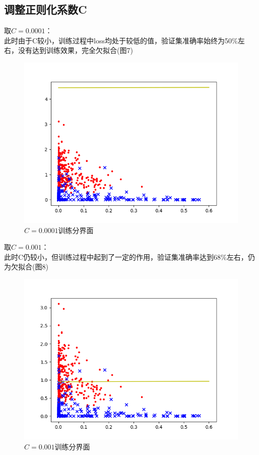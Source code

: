 \documentclass[a4paper]{article}
\begin{document}
\subsection{调整正则化系数C}
取$ C=0.0001 $：\\
此时由于C较小，训练过程中loss均处于较低的值，验证集准确率始终为50\%左右，没有达到训练效果，完全欠拟合(图7)\\
\begin{figure}
    \centering
    \includegraphics[width=12cm]{Fig_7.png}
    \caption{$ C = 0.0001 $训练分界面}
\end{figure}

取$ C = 0.001 $：\\
此时C仍较小，但训练过程中起到了一定的作用，验证集准确率达到68\%左右，仍为欠拟合(图8)\\
\begin{figure}
    \centering
    \includegraphics[width=12cm]{Fig_8.png}
    \caption{$ C = 0.001 $训练分界面}
\end{figure}
\end{document}
